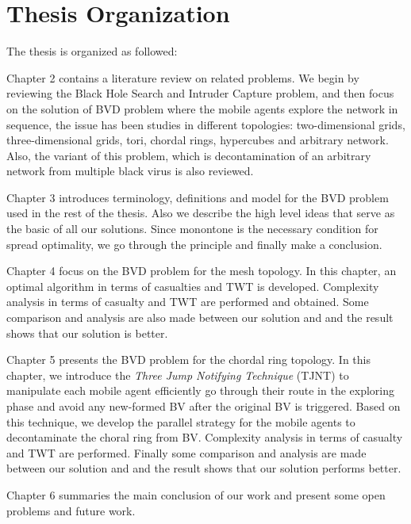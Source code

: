 
\section{Thesis Organization} 

The thesis is organized as followed:

Chapter 2 contains a literature review on related problems. We begin by reviewing the Black Hole Search and Intruder Capture problem, and then focus on the solution of BVD problem where the mobile agents explore the network in sequence, the issue has been studies in different topologies: two-dimensional grids, three-dimensional grids, tori, chordal rings, hypercubes and arbitrary network. Also, the variant of this problem, which is decontamination of an arbitrary network from multiple black virus is also reviewed. 

Chapter 3 introduces terminology, definitions and model for the BVD problem used in the rest of the thesis. Also we describe the high level ideas that serve as the basic of all our solutions. Since monontone is the necessary condition for spread optimality, we go through the principle and finally make a conclusion.

Chapter 4 focus on the BVD problem for the mesh topology. In this chapter, an optimal algorithm in terms of casualties and TWT is developed. Complexity analysis in terms of casualty and TWT are performed and obtained. Some comparison and analysis are also made between our solution and \cite{Cai} and the result shows that our solution is better.

Chapter 5 presents the BVD problem for the chordal ring topology. In this chapter, we introduce the {\em Three Jump Notifying Technique} (TJNT) to manipulate each mobile agent efficiently go through their route in the exploring phase and avoid any new-formed BV after the original BV is triggered. Based on this technique, we develop the parallel strategy for the mobile agents to decontaminate the choral ring from BV. Complexity analysis in terms of casualty and TWT are performed. Finally some comparison and analysis are made between our solution and \cite{Alotaibi} and the result shows that our solution performs better.

Chapter 6 summaries the main conclusion of our work and present some open problems and future work.
  




